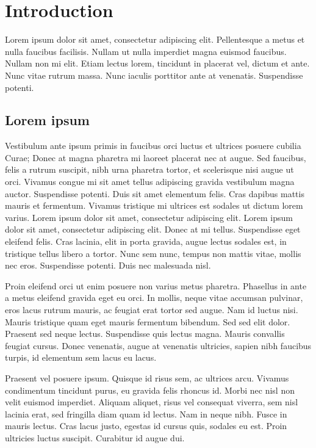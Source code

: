 \section{Introduction}
\label{sec:intro}

\cappar Lorem ipsum dolor sit amet, consectetur adipiscing elit. Pellentesque a metus et nulla faucibus facilisis. Nullam ut nulla imperdiet magna euismod faucibus. Nullam non mi elit. Etiam lectus lorem, tincidunt in placerat vel, dictum et ante. Nunc vitae rutrum massa. Nunc iaculis porttitor ante at venenatis. Suspendisse potenti.

\vspace{.6cm}
\secttoc
\vspace{.6cm}

\subsection{Lorem ipsum}
Vestibulum ante ipsum primis in faucibus orci luctus et ultrices posuere cubilia Curae; Donec at magna pharetra mi laoreet placerat nec at augue. Sed faucibus, felis a rutrum suscipit, nibh urna pharetra tortor, et scelerisque nisi augue ut orci. Vivamus congue mi sit amet tellus adipiscing gravida vestibulum magna auctor. Suspendisse potenti. Duis sit amet elementum felis. Cras dapibus mattis mauris et fermentum. Vivamus tristique mi ultrices est sodales ut dictum lorem varius. Lorem ipsum dolor sit amet, consectetur adipiscing elit. Lorem ipsum dolor sit amet, consectetur adipiscing elit. Donec at mi tellus. Suspendisse eget eleifend felis. Cras lacinia, elit in porta gravida, augue lectus sodales est, in tristique tellus libero a tortor. Nunc sem nunc, tempus non mattis vitae, mollis nec eros. Suspendisse potenti. Duis nec malesuada nisl.

Proin eleifend orci ut enim posuere non varius metus pharetra. Phasellus in ante a metus eleifend gravida eget eu orci. In mollis, neque vitae accumsan pulvinar, eros lacus rutrum mauris, ac feugiat erat tortor sed augue. Nam id luctus nisi. Mauris tristique quam eget mauris fermentum bibendum. Sed sed elit dolor. Praesent sed neque lectus. Suspendisse quis lectus magna. Mauris convallis feugiat cursus. Donec venenatis, augue at venenatis ultricies, sapien nibh faucibus turpis, id elementum sem lacus eu lacus.

Praesent vel posuere ipsum. Quisque id risus sem, ac ultrices arcu. Vivamus condimentum tincidunt purus, eu gravida felis rhoncus id. Morbi nec nisl non velit euismod imperdiet. Aliquam aliquet, risus vel consequat viverra, sem nisl lacinia erat, sed fringilla diam quam id lectus. Nam in neque nibh. Fusce in mauris lectus. Cras lacus justo, egestas id cursus quis, sodales eu est. Proin ultricies luctus suscipit. Curabitur id augue dui.

